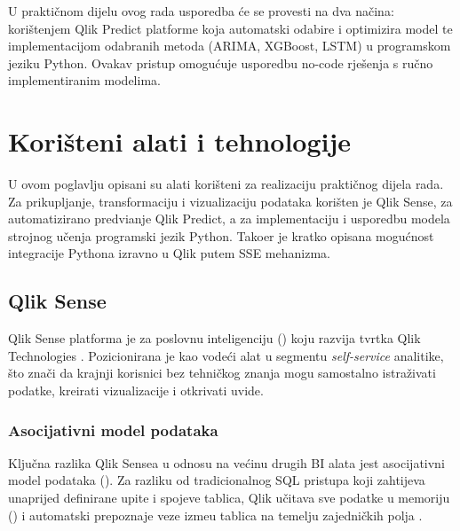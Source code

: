 \documentclass[zavrsnirad]{fer}
\begin{document}
U prakti\v{c}nom dijelu ovog rada usporedba \'{c}e se provesti na dva na\v{c}ina: kori\v{s}tenjem Qlik Predict platforme koja automatski odabire i optimizira model te implementacijom odabranih metoda (ARIMA, XGBoost, LSTM) u programskom jeziku Python. Ovakav pristup omogu\'{c}uje usporedbu no-code rje\v{s}enja s ru\v{c}no implementiranim modelima.


\chapter{Kori\v{s}teni alati i tehnologije}
\label{pog:alati}

U ovom poglavlju opisani su alati kori\v{s}teni za realizaciju prakti\v{c}nog dijela rada. Za prikupljanje, transformaciju i vizualizaciju podataka kori\v{s}ten je Qlik Sense, za automatizirano predvi\dj anje Qlik Predict, a za implementaciju i usporedbu modela strojnog u\v{c}enja programski jezik Python. Tako\dj er je kratko opisana mogu\'{c}nost integracije Pythona izravno u Qlik putem SSE mehanizma.

\section{Qlik Sense}
\label{sec:qlik}

Qlik Sense platforma je za poslovnu inteligenciju () koju razvija tvrtka Qlik Technologies \citep{qlik2024}. Pozicionirana je kao vode\'{c}i alat u segmentu \textit{self-service} analitike, \v{s}to zna\v{c}i da krajnji korisnici bez tehni\v{c}kog znanja mogu samostalno istra\v{z}ivati podatke, kreirati vizualizacije i otkrivati uvide.

\subsection{Asocijativni model podataka}
\label{subsec:qlik_model}

Klju\v{c}na razlika Qlik Sensea u odnosu na ve\'{c}inu drugih BI alata jest asocijativni model podataka (). Za razliku od tradicionalnog SQL pristupa koji zahtijeva unaprijed definirane upite i spojeve tablica, Qlik u\v{c}itava sve podatke u memoriju () i automatski prepoznaje veze izme\dj u tablica na temelju zajedni\v{c}kih polja \citep{qlik2024}.
\end{document}
